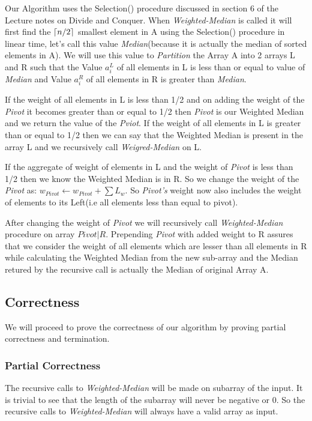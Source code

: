 \documentclass[8pt]{article}
\DeclarePairedDelimiter\ceil{\lceil}{\rceil}
\begin{document}
\begin{flushleft}
Our Algorithm uses the Selection() procedure discussed in section 6 of the Lecture 
notes on Divide and Conquer. When \textit{Weighted-Median} is called it will first
find the $\ceil{n/2}$ smallest element in A using the Selection() procedure in linear
time, let's call this value \textit{Median}(because it is actually the median of
sorted elements in A). We will use this value to \textit{Partition} the Array A into
2 arrays L and R such that the Value $a_i^L$ of all elements in L is less than or equal
to value of \textit{Median} and Value $a_i^R$ of all elements in R is greater than \textit{Median}.

If the weight of all elements in L is less than 1/2 and on adding the weight of the \textit{Pivot}
it becomes greater than or equal to 1/2 then \textit{Pivot} is our Weighted Median and
we return the value of the \textit{Pviot}. If the weight of all elements in L is greater
than or equal to 1/2 then we can say that the Weighted Median is present in the array L
and we recursively call \textit{Weigred-Median} on L.

If the aggregate of weight of elements in L and the weight of \textit{Pivot} is less than 1/2
then we know the Weighted Median is in R. So we change the weight of the
\textit{Pivot} as: $w_{Pivot} \leftarrow w_{Pivot} + \sum L_w$. So \textit{Pivot's} weight
now also includes the weight of elements to its Left(i.e all elements less than equal to pivot).

After changing the weight of \textit{Pivot} we will recursively call \textit{Weighted-Median}
procedure on array $\textit{Pivot}|R$. Prepending \textit{Pivot} with added weight to R
assures that we consider the weight of all elements which are lesser than all elements in R
while calculating the Weighted Median from the new sub-array and the Median retured by the
recursive call is actually the Median of original Array A.

\newpage
\subsection{Correctness}
We will proceed to prove the correctness of our algorithm by proving partial correctness
and termination.

\subsubsection{Partial Correctness}
The recursive calls to \textit{Weighted-Median} will be made on subarray of the input.
It is trivial to see that the length of the subarray will never be negative or 0. So
the recursive calls to \textit{Weighted-Median} will always have a valid array as input.


\end{flushleft}
\end{document}
